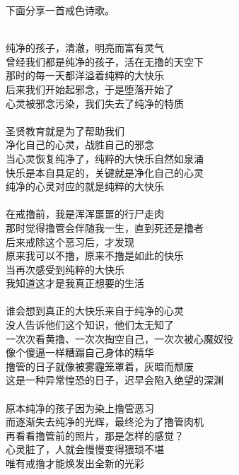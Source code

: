 下面分享一首戒色诗歌。

\begin{adjustwidth}{-1.5em}{-1.5em}
    \begin{poem}[纯净纯善赤子之心]
        \begin{multicols}{2}
            \centering~\\
            纯净的孩子，清澈，明亮而富有灵气 \\ 曾经我们都是纯净的孩子，活在无撸的天空下 \\ 那时的每一天都洋溢着纯粹的大快乐 \\ 后来我们开始起邪念，于是堕落开始了 \\ 心灵被邪念污染，我们失去了纯净的特质 \\~\\
            圣贤教育就是为了帮助我们 \\ 净化自己的心灵，战胜自己的邪念 \\ 当心灵恢复纯净了，纯粹的大快乐自然如泉涌 \\ 快乐是本自具足的，关键就是净化自己的心灵 \\ 纯净的心灵对应的就是纯粹的大快乐 \\~\\
            在戒撸前，我是浑浑噩噩的行尸走肉 \\ 那时觉得撸管会伴随我一生，直到死还是撸者 \\ 后来戒除这个恶习后，才发现 \\ 原来我可以不撸，原来不撸是如此的快乐 \\ 当再次感受到纯粹的大快乐 \\ 我知道这才是我真正想要的生活 \\~\\
            谁会想到真正的大快乐来自于纯净的心灵 \\ 没人告诉他们这个知识，他们太无知了 \\ 一次次看黄撸、一次次掏空自己，一次次被心魔奴役 \\ 像个傻逼一样糟蹋自己身体的精华 \\ 撸管的日子就像被雾霾笼罩着，灰暗而颓废 \\ 这是一种异常惶恐的日子，迟早会陷入绝望的深渊 \\~\\
            原本纯净的孩子因为染上撸管恶习 \\ 而逐渐失去纯净的光辉，最终沦为了撸管肉机 \\ 再看看撸管前的照片，那是怎样的感觉？ \\ 心灵脏了，人就会慢慢变得猥琐不堪 \\ 唯有戒撸才能焕发出全新的光彩 \\~\\

\end{multicols}
\end{poem}
\end{adjustwidth}
